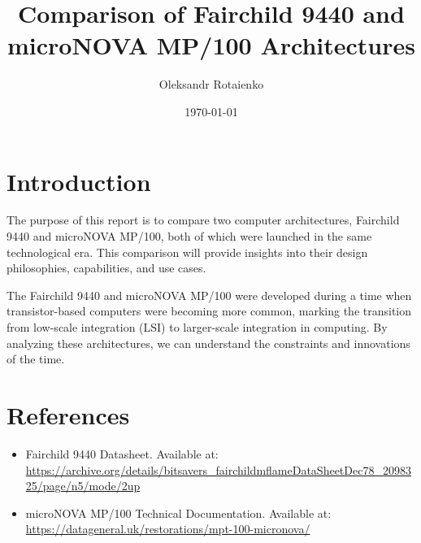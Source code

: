 \documentclass[a4paper,12pt]{article}
\title{Comparison of Fairchild 9440 and microNOVA MP/100 Architectures}
\author{Oleksandr Rotaienko}
\date{\today}
\begin{document}
\maketitle

\tableofcontents
\newpage

\section{Introduction}

The purpose of this report is to compare two computer architectures, Fairchild 9440 and microNOVA MP/100, both of which were launched in the same technological era. This comparison will provide insights into their design philosophies, capabilities, and use cases.

The Fairchild 9440 and microNOVA MP/100 were developed during a time when transistor-based computers were becoming more common, marking the transition from low-scale integration (LSI) to larger-scale integration in computing. By analyzing these architectures, we can understand the constraints and innovations of the time.


\section*{References}
\begin{itemize}
    \item Fairchild 9440 Datasheet. Available at: \url{https://archive.org/details/bitsavers_fairchildmflameDataSheetDec78_2098325/page/n5/mode/2up}
    \item microNOVA MP/100 Technical Documentation. Available at: \url{https://datageneral.uk/restorations/mpt-100-micronova/}
\end{itemize}
\end{document}
